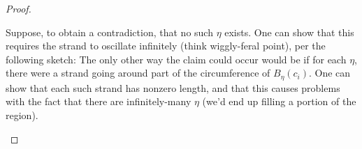 \begin{proof}
\begin{leftbar}




    Suppose, to obtain a contradiction, that no such $\eta$ exists.
    One can show that this requires the strand to oscillate infinitely
    (think wiggly-feral point), per the following sketch: The only
    other way the claim could occur would be if for each $\eta$, there
    were a strand going around part of the circumference of
    $B_\eta(c_i)$. One can show that each such strand has nonzero
    length, and that this causes problems with the fact that there are
    infinitely-many $\eta$ (we'd end up filling a portion of the
    region).


\end{leftbar}
\end{proof}
